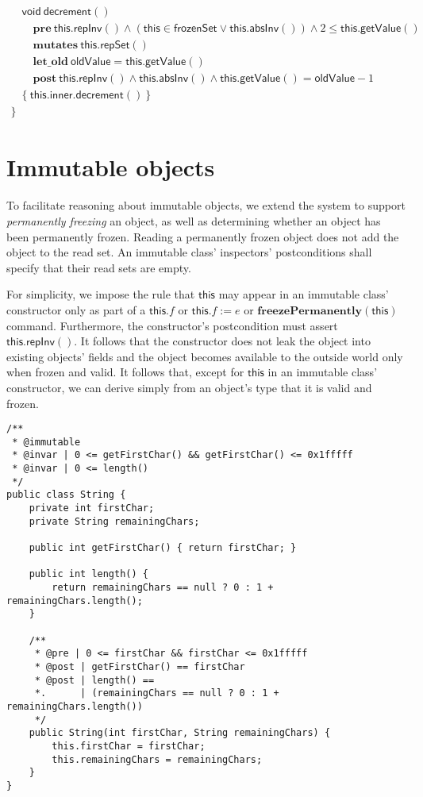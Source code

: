 \documentclass{article}
\begin{document}
$$\begin{array}{l}
\\
\quad \mathsf{void}\ \mathsf{decrement}()\\
\quad\quad \mathbf{pre}\ \mathsf{this}.\mathsf{repInv}() \land (\mathsf{this} \in \mathsf{frozenSet} \lor \mathsf{this}.\mathsf{absInv}()) \land 2 \le \mathsf{this}.\mathsf{getValue}()\\
\quad\quad \mathbf{mutates}\ \mathsf{this}.\mathsf{repSet}()\\
\quad\quad \mathbf{let\_old}\ \mathsf{oldValue} = \mathsf{this}.\mathsf{getValue}()\\
\quad\quad \mathbf{post}\ \mathsf{this}.\mathsf{repInv}() \land \mathsf{this}.\mathsf{absInv}() \land \mathsf{this}.\mathsf{getValue}() = \mathsf{oldValue} - 1\\
\quad \{\ \mathsf{this}.\mathsf{inner}.\mathsf{decrement}()\ \}\\
\}
\end{array}$$

\section{Immutable objects}

To facilitate reasoning about immutable objects, we extend the system to support \emph{permanently freezing} an object, as well as determining whether an object has been permanently frozen. Reading a permanently frozen object does not add the object to the read set. An immutable class' inspectors' postconditions shall specify that their read sets are empty.

For simplicity, we impose the rule that $\mathsf{this}$ may appear in an immutable class' constructor only as part of a $\mathsf{this}.f$ or $\mathsf{this}.f := e$ or $\mathbf{freezePermanently}(\mathsf{this})$ command. Furthermore, the constructor's postcondition must assert $\mathsf{this}.\mathsf{repInv}()$. It follows that the constructor does not leak the object into existing objects' fields and the object becomes available to the outside world only when frozen and valid. It follows that, except for $\mathsf{this}$ in an immutable class' constructor, we can derive simply from an object's type that it is valid and frozen.

\begin{verbatim}
/**
 * @immutable
 * @invar | 0 <= getFirstChar() && getFirstChar() <= 0x1fffff
 * @invar | 0 <= length()
 */
public class String {
    private int firstChar;
    private String remainingChars;
    
    public int getFirstChar() { return firstChar; }
    
    public int length() {
        return remainingChars == null ? 0 : 1 + remainingChars.length();
    }
    
    /**
     * @pre | 0 <= firstChar && firstChar <= 0x1fffff
     * @post | getFirstChar() == firstChar
     * @post | length() ==
     *.      | (remainingChars == null ? 0 : 1 + remainingChars.length())
     */
    public String(int firstChar, String remainingChars) {
        this.firstChar = firstChar;
        this.remainingChars = remainingChars;
    }
}
\end{verbatim}
\end{document}
